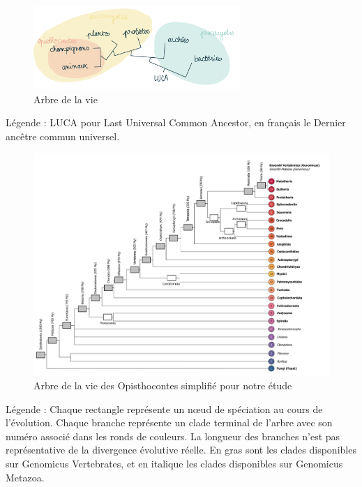 \begin{figure}[H]
    \centering
    \includegraphics[width=0.7\textwidth]{figures/corps/figure7.png}
    \caption{Arbre de la vie}
    \label{fig:7_arbre}
\end{figure}
Légende : LUCA pour Last Universal Common Ancestor, en français le Dernier ancêtre commun universel. \\
\begin{figure}[H]
    \centering
    \includegraphics[width=1\textwidth]{figures/corps/figure8.png}
    \caption{Arbre de la vie des Opisthocontes simplifié pour notre étude}
    \label{fig:8_opistho}
\end{figure}
Légende : Chaque rectangle représente un nœud de spéciation au cours de l’évolution. Chaque branche représente un clade terminal de l’arbre avec son numéro associé dans les ronds de couleurs. La longueur des branches n’est pas représentative de la divergence évolutive réelle. En gras sont les clades disponibles sur Genomicus Vertebrates, et en italique les clades disponibles sur Genomicus Metazoa. \newpage

